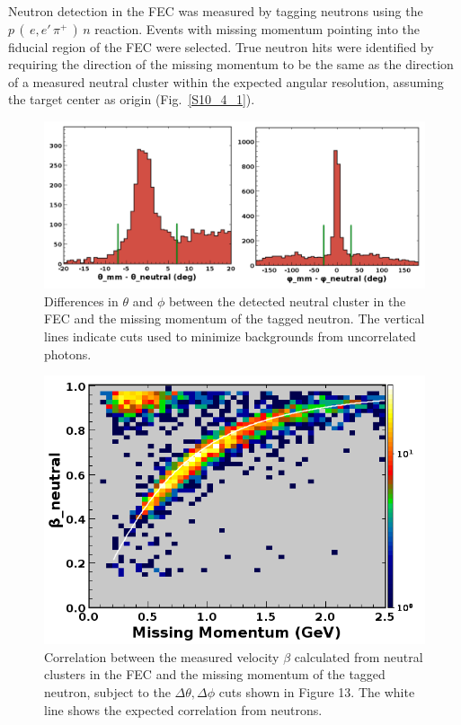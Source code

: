 Neutron detection in the FEC was measured by tagging neutrons using the $p\,(\,e,e'\,\pi^+\,)\,n$ reaction. Events with missing momentum pointing into the fiducial region of the FEC were selected.  True neutron hits were identified by requiring the direction of the missing momentum to be the same as the direction of a measured neutral cluster within the expected angular resolution, assuming the target center
as origin (Fig.~\ref{S10_4_1}).  

\begin{figure}[hbt]
\centering
\includegraphics[width=1.0\columnwidth,keepaspectratio]{img/S10_4_1.png}
\caption[]{Differences in $\theta$ and $\phi$ between the detected neutral cluster in the FEC and the missing momentum of the tagged neutron.  The vertical lines indicate cuts used to minimize backgrounds from uncorrelated photons.}
\label{fig:S10_4_1}
\end{figure}

\begin{figure}[hbt]
\centering
\includegraphics[width=1.0\columnwidth,keepaspectratio]{img/S10_4_2.png}
\caption[]{Correlation between the measured velocity $\beta$ calculated from neutral clusters in the FEC and the missing momentum of the tagged neutron, subject to the $\Delta\theta,\Delta\phi$ cuts shown in Figure 13.  The white line shows the expected correlation from neutrons.}
\label{fig:S10_4_2}
\end{figure}






